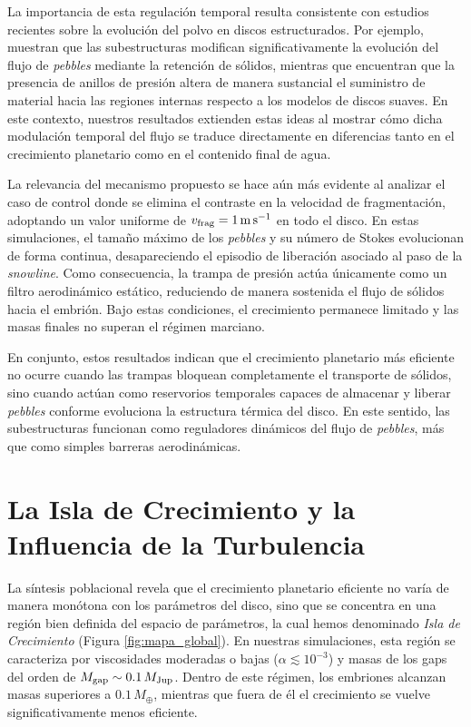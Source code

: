 La importancia de esta regulación temporal resulta consistente con estudios recientes sobre la evolución del polvo en discos estructurados. Por ejemplo, \citet{Appelgren2025} muestran que las subestructuras modifican significativamente la evolución del flujo de \textit{pebbles} mediante la retención de sólidos, mientras que \citet{Lau2024} encuentran que la presencia de anillos de presión altera de manera sustancial el suministro de material hacia las regiones internas respecto a los modelos de discos suaves. En este contexto, nuestros resultados extienden estas ideas al mostrar cómo dicha modulación temporal del flujo se traduce directamente en diferencias tanto en el crecimiento planetario como en el contenido final de agua.

La relevancia del mecanismo propuesto se hace aún más evidente al analizar el caso de control donde se elimina el contraste en la velocidad de fragmentación, adoptando un valor uniforme de $v_{\rm frag}=1\,{\rm m\,s^{-1}}$ en todo el disco. En estas simulaciones, el tamaño máximo de los \textit{pebbles} y su número de Stokes evolucionan de forma continua, desapareciendo el episodio de liberación asociado al paso de la \textit{snowline}. Como consecuencia, la trampa de presión actúa únicamente como un filtro aerodinámico estático, reduciendo de manera sostenida el flujo de sólidos hacia el embrión. Bajo estas condiciones, el crecimiento permanece limitado y las masas finales no superan el régimen marciano.

En conjunto, estos resultados indican que el crecimiento planetario más eficiente no ocurre cuando las trampas bloquean completamente el transporte de sólidos, sino cuando actúan como reservorios temporales capaces de almacenar y liberar \textit{pebbles} conforme evoluciona la estructura térmica del disco. En este sentido, las subestructuras funcionan como reguladores dinámicos del flujo de \textit{pebbles}, más que como simples barreras aerodinámicas.

\section{La Isla de Crecimiento y la Influencia de la Turbulencia}

La síntesis poblacional revela que el crecimiento planetario eficiente no varía de manera monótona con los parámetros del disco, sino que se concentra en una región bien definida del espacio de parámetros, la cual hemos denominado \textit{Isla de Crecimiento} (Figura \ref{fig:mapa_global}). En nuestras simulaciones, esta región se caracteriza por viscosidades moderadas o bajas ($\alpha \lesssim 10^{-3}$) y masas de los gaps del orden de $M_{\rm gap}\sim0.1\,M_{\rm Jup}$. Dentro de este régimen, los embriones alcanzan masas superiores a $0.1\,M_\oplus$, mientras que fuera de él el crecimiento se vuelve significativamente menos eficiente.

